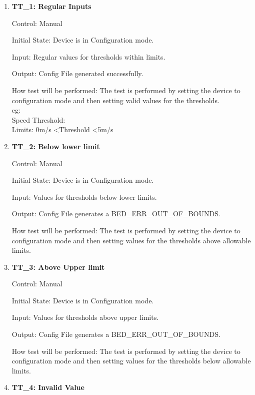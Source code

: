\documentclass[12pt, titlepage]{article}
\begin{document}
\begin{enumerate}
	\item{\textbf{TT\_1: Regular Inputs} \\}\label{TT1}
	
		Control: Manual 
							
		Initial State: Device is in Configuration mode.
							
		Input: Regular values for thresholds within limits.
		
		Output: Config File generated successfully.
		
		How test will be performed: The test is performed by setting the device to configuration mode and then setting valid values for the thresholds.\\
		eg: \\
		Speed Threshold:\\
		Limits: 0m/s \textless Threshold \textless 5m/s

	\item{\textbf{TT\_2: Below lower limit} \\}\label{TT2}
	
		Control: Manual 
							
		Initial State: Device is in Configuration mode.
							
		Input: Values for thresholds below lower limits.
		
		Output: Config File generates a BED\_ERR\_OUT\_OF\_BOUNDS.

		How test will be performed: The test is performed by setting the device to configuration mode and then setting values for the thresholds above allowable limits.

	\item{\textbf{TT\_3: Above Upper limit }\\}\label{TT3}
	
		Control: Manual 
							
		Initial State: Device is in Configuration mode.
							
		Input: Values for thresholds above upper limits.
		
		Output: Config File generates a BED\_ERR\_OUT\_OF\_BOUNDS.
		
		How test will be performed: The test is performed by setting the device to configuration mode and then setting values for the thresholds below allowable limits.

	\item{\textbf{TT\_4: Invalid Value} \\}\label{TT4}
	

\end{enumerate}
\end{document}
